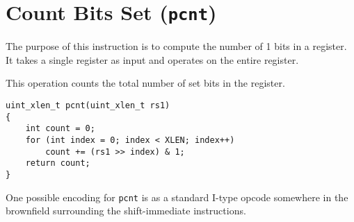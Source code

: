 
\section{Count Bits Set (\texttt{pcnt})}

The purpose of this instruction is to compute the number of 1 bits in a
register. It takes a single register as input and operates on the entire
register.

This operation counts the total number of set bits in the register.

\begin{verbatim}
uint_xlen_t pcnt(uint_xlen_t rs1)
{
    int count = 0;
    for (int index = 0; index < XLEN; index++)
        count += (rs1 >> index) & 1;
    return count;
}
\end{verbatim}



One possible encoding for \texttt{pcnt} is as a standard I-type opcode somewhere
in the brownfield surrounding the shift-immediate instructions.

%
%
%
%
%
%
%
%
%
%

